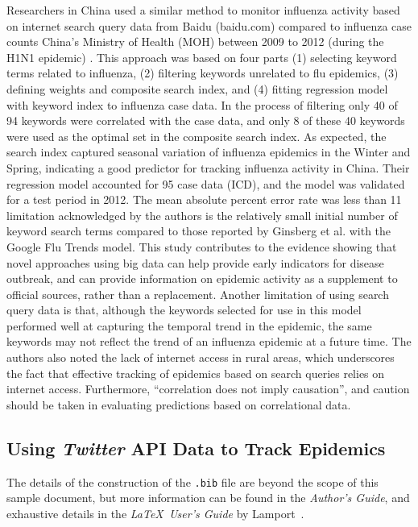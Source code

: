 \documentclass[sigconf]{acmart}
\begin{document}
Researchers in China used a similar method to monitor influenza activity based 
on internet search query data from Baidu (baidu.com) compared to influenza case 
counts China’s Ministry of Health (MOH) between 2009 to 2012 (during the H1N1 
epidemic) \cite{yuan13}. This approach was based on four parts (1) selecting 
keyword terms related to influenza, (2) filtering keywords unrelated to flu 
epidemics, (3) defining weights and composite search index, and (4) fitting 
regression model with keyword index to influenza case data. In the process of 
filtering only 40 of 94 keywords were correlated with the case data, and only 8 
of these 40 keywords were used as the optimal set in the composite search index. 
As expected, the search index captured seasonal variation of influenza epidemics 
in the Winter and Spring, indicating a good predictor for tracking influenza activity
in China.  Their regression model accounted for 95%
case data (ICD), and the model was validated for a test period in 2012. The mean 
absolute percent error rate was less than 11%
limitation acknowledged by the authors is the relatively small initial number 
of keyword search terms compared to those reported by Ginsberg et al. with the 
Google Flu Trends model. This study contributes to the evidence showing that novel
approaches using big data can help provide early indicators for disease outbreak, 
and can provide information on epidemic activity as a supplement to official sources, 
rather than a replacement. Another limitation of using search query data is that, 
although the keywords selected for use in this model performed well at capturing 
the temporal trend in the epidemic, the same keywords may not reflect the trend of 
an influenza epidemic at a future time. The authors also noted the lack of internet 
access in rural areas, which underscores the fact that effective tracking of epidemics 
based on search queries relies on internet access. Furthermore, “correlation does 
not imply causation”, and caution should be taken in evaluating predictions based 
on correlational data.    


\subsection{Using {\itshape Twitter} API Data to Track Epidemics}

The details of the construction of the \texttt{.bib} file are beyond
the scope of this sample document, but more information can be found
in the \textit{Author's Guide}, and exhaustive details in the
\textit{\LaTeX\ User's Guide} by Lamport~.
\end{document}
